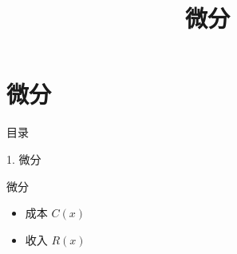 \documentclass[aspectratio=169,10pt,fontset=fandol]{ctexbeamer}
\title{微分}
\begin{document}
\section{微分}
\begin{frame}[t,fragile]{目录}
\normalsize
{\color{blue}\normalsize 1. 微分\par}\vspace{0.22em}
\end{frame}
\begin{frame}[t,fragile]{微分}
\normalsize
{\normalsize
\begin{itemize}\item 成本 $C(x)$\item 收入 $R(x)$\end{itemize}
}
\end{frame}
\end{document}
